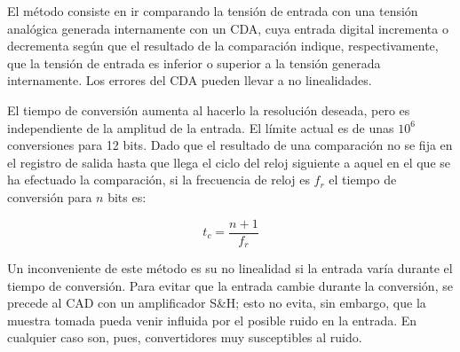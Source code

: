 El método consiste en ir comparando la tensión de entrada con una tensión analógica generada internamente con un CDA, cuya entrada digital incrementa o decrementa según que el resultado de la comparación indique, respectivamente, que la tensión de entrada es inferior o superior a la tensión generada internamente. Los errores del CDA pueden llevar a no linealidades.

El tiempo de conversión aumenta al hacerlo la resolución deseada, pero es independiente de la amplitud de la entrada. El límite actual es de unas $10^6$ conversiones para 12 bits. Dado que el resultado de una comparación no se fija en el registro de salida hasta que llega el ciclo del reloj siguiente a aquel en el que se ha efectuado la comparación, si la frecuencia de reloj es $f_r$ el tiempo de conversión para $n$ bits es:

\begin{equation}
    t_c = \frac{n + 1}{f_r}
\end{equation}

Un inconveniente de este método es su no linealidad si la entrada varía durante el tiempo de conversión. Para evitar que la entrada cambie durante la conversión, se precede al CAD con un amplificador S\&H; esto no evita, sin embargo, que la muestra tomada pueda venir influida por el posible ruido en la entrada. En cualquier caso son, pues, convertidores muy susceptibles al ruido.

